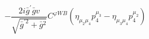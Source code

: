%
\begin{dmath*}
%
  -  \frac{2 i {\bar g}^\prime {\bar g}{} v}{\sqrt{{\bar g}^{\prime 2} + {\bar g}{}^2}}C^{ \varphi  WB} \left(\eta_{\mu_2 \mu_4} p_4^{\mu_3} - \eta_{\mu_3 \mu_4} p_4^{\mu_2}\right)
%
\end{dmath*}
%
